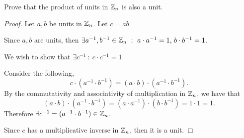\documentclass[../hw2]{subfiles}
\begin{document}
\begin{problem}[5]
Prove that the product of units in $\mathbb{Z}_n$ is also a unit.
\end{problem}
\begin{proof}
	Let $a,b$ be units in  $\mathbb{Z}_n$. Let $c=ab$.

	Since $a,b$ are units, then $\exists a^{-1},b^{-1}\in \mathbb{Z}_n\ :\ a\cdot a^{-1}=1,\, b\cdot b^{-1}=1$.

	We wish to show that $\exists c^{-1}\ :\ c\cdot c^{-1}=1$.

	Consider the following, \[
		c\cdot (a^{-1}\cdot b^{-1})=(a\cdot b)\cdot (a^{-1}\cdot b^{-1})
		.\]
	By the commutativity and associativity of multiplication in $\mathbb{Z}_n$, we have that \[
		(a\cdot b)\cdot (a^{-1}\cdot b^{-1}) = (a\cdot a^{-1}) \cdot (b\cdot b^{-1}) = 1\cdot 1 = 1
		.\]
	Therefore $\exists c^{-1}=(a^{-1}\cdot b^{-1}) \in \mathbb{Z}_n$.

	Since $c$ has a multiplicative inverse in  $\mathbb{Z}_n$, then it is a unit.
\end{proof}
\end{document}
